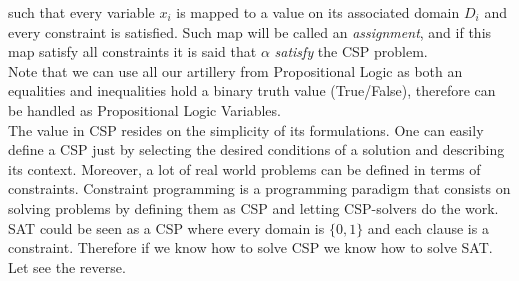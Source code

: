   such that every variable $x_i$ is mapped to a value on its associated domain $D_i$ and every constraint is satisfied. Such map will be called an \emph{assignment}, and if this map satisfy all constraints it is said that $\alpha$ \emph{satisfy} the CSP problem.\\


Note that we can use all our artillery from Propositional Logic as both an equalities and inequalities hold a binary truth value (True/False), therefore can be handled as Propositional Logic Variables. \\

The value in CSP resides on the simplicity of its formulations.  One can  easily define a CSP just by selecting the desired conditions of a solution and describing its context. Moreover, a lot of real world problems can be defined in terms of constraints. Constraint programming is a programming paradigm that consists on solving problems by defining them as CSP and letting CSP-solvers do the work.\\

SAT could be seen as a CSP where every domain is $\{0,1\}$ and each clause is a constraint. Therefore if we know how to solve CSP we know how to solve SAT. Let see the reverse.

